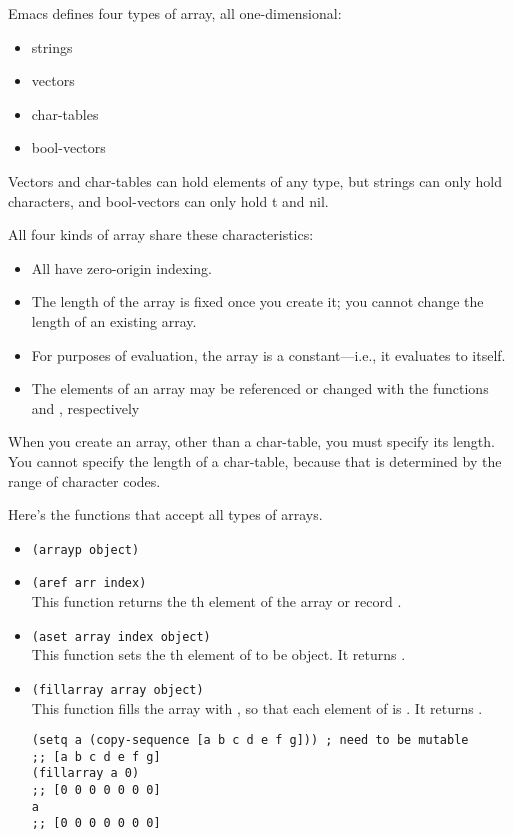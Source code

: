 Emacs defines four types of array, all one-dimensional:
\begin{itemize}
\item strings 
\item vectors
\item char-tables
\item bool-vectors
\end{itemize}

Vectors and char-tables can hold elements of any type, but strings can only hold characters, and bool-vectors can only hold t and nil.


All four kinds of array share these characteristics:
\begin{itemize}
\item All have zero-origin indexing.
\item The length of the array is fixed once you create it; you cannot change the length of an existing array.
\item For purposes of evaluation, the array is a constant—i.e., it evaluates to itself.
\item The elements of an array may be referenced or changed with the functions  and , respectively 
\end{itemize}


When you create an array, other than a char-table, you must specify its length.
You cannot specify the length of a char-table, because that is determined by the range of character codes.



Here's the functions that accept all types of arrays.
\begin{itemize}
\item \lstinline|(arrayp object)|
\item \lstinline|(aref arr index)|\\
  This function returns the th element of the array or record .
\item \lstinline|(aset array index object)|\\
  This function sets the th element of  to be object.
  It returns .
\item \lstinline|(fillarray array object)|\\
  This function fills the array  with , so that each element of  is .
  It returns .
\begin{lstlisting}
(setq a (copy-sequence [a b c d e f g])) ; need to be mutable
;; [a b c d e f g]
(fillarray a 0)
;; [0 0 0 0 0 0 0]
a
;; [0 0 0 0 0 0 0]
\end{lstlisting}
\end{itemize}

